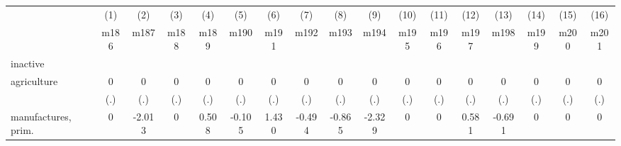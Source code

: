 {
\def\sym#1{\ifmmode^{#1}\else\(^{#1}\)\fi}
\begin{tabular}{l*{16}{c}}
\hline\hline
                    &\multicolumn{1}{c}{(1)}&\multicolumn{1}{c}{(2)}&\multicolumn{1}{c}{(3)}&\multicolumn{1}{c}{(4)}&\multicolumn{1}{c}{(5)}&\multicolumn{1}{c}{(6)}&\multicolumn{1}{c}{(7)}&\multicolumn{1}{c}{(8)}&\multicolumn{1}{c}{(9)}&\multicolumn{1}{c}{(10)}&\multicolumn{1}{c}{(11)}&\multicolumn{1}{c}{(12)}&\multicolumn{1}{c}{(13)}&\multicolumn{1}{c}{(14)}&\multicolumn{1}{c}{(15)}&\multicolumn{1}{c}{(16)}\\
                    &\multicolumn{1}{c}{m186}&\multicolumn{1}{c}{m187}&\multicolumn{1}{c}{m188}&\multicolumn{1}{c}{m189}&\multicolumn{1}{c}{m190}&\multicolumn{1}{c}{m191}&\multicolumn{1}{c}{m192}&\multicolumn{1}{c}{m193}&\multicolumn{1}{c}{m194}&\multicolumn{1}{c}{m195}&\multicolumn{1}{c}{m196}&\multicolumn{1}{c}{m197}&\multicolumn{1}{c}{m198}&\multicolumn{1}{c}{m199}&\multicolumn{1}{c}{m200}&\multicolumn{1}{c}{m201}\\
\hline
inactive            &                     &                     &                     &                     &                     &                     &                     &                     &                     &                     &                     &                     &                     &                     &                     &                     \\
agriculture         &           0         &           0         &           0         &           0         &           0         &           0         &           0         &           0         &           0         &           0         &           0         &           0         &           0         &           0         &           0         &           0         \\
                    &         (.)         &         (.)         &         (.)         &         (.)         &         (.)         &         (.)         &         (.)         &         (.)         &         (.)         &         (.)         &         (.)         &         (.)         &         (.)         &         (.)         &         (.)         &         (.)         \\
[1em]
manufactures, prim. &           0         &      -2.013         &           0         &       0.508         &      -0.105         &       1.430         &      -0.494         &      -0.865         &      -2.329         &           0         &           0         &       0.581         &      -0.691         &           0         &           0         &           0         \\

\end{tabular}}

